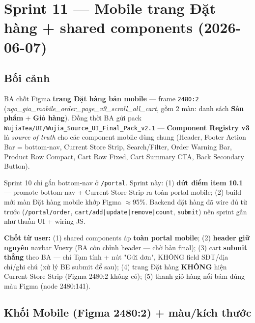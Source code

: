 \chapter{Sprint 11 --- Mobile trang Đặt hàng + shared components (2026-06-07)}

\section{Bối cảnh}

BA chốt Figma \textbf{trang Đặt hàng bản mobile} --- frame \texttt{2480:2}
(\emph{ngo\_gia\_mobile\_order\_page\_v9\_scroll\_all\_cart}, gồm 2 màn: danh sách
\textbf{Sản phẩm} + \textbf{Giỏ hàng}). Đồng thời BA gửi pack
\texttt{WujiaTea/UI/Wujia\_Source\_UI\_Final\_Pack\_v2.1} ---
\textbf{Component Registry v3} là \emph{source of truth} cho các component mobile
dùng chung (Header, Footer Action Bar = bottom-nav, Current Store Strip,
Search/Filter, Order Warning Bar, Product Row Compact, Cart Row Fixed, Cart
Summary CTA, Back Secondary Button).

Sprint 10 chỉ gắn bottom-nav ở \texttt{/portal}. Sprint này: (1) \textbf{dứt điểm
item 10.1} --- promote bottom-nav + Current Store Strip ra toàn portal mobile;
(2) build mới màn Đặt hàng mobile khớp Figma \(\approx\)95\%. Backend đặt hàng đã
wire đủ từ trước (\texttt{/portal/order}, \texttt{cart/add|update|remove|count},
\texttt{submit}) nên sprint gần như thuần UI + wiring JS.

\textbf{Chốt từ user:} (1) shared components áp \textbf{toàn portal mobile};
(2) \textbf{header giữ nguyên} navbar Vuexy (BA còn chỉnh header --- chờ bản
final); (3) cart \textbf{submit thẳng} theo BA --- chỉ Tạm tính + nút "Gửi đơn",
KHÔNG field SĐT/địa chỉ/ghi chú (xử lý BE submit để sau); (4) trang Đặt hàng
\textbf{KHÔNG} hiện Current Store Strip (Figma 2480:2 không có); (5) thanh giỏ hàng
nổi bám đúng màu Figma (node 2480:141).

\section{Khối Mobile (Figma 2480:2) + màu/kích thước}

